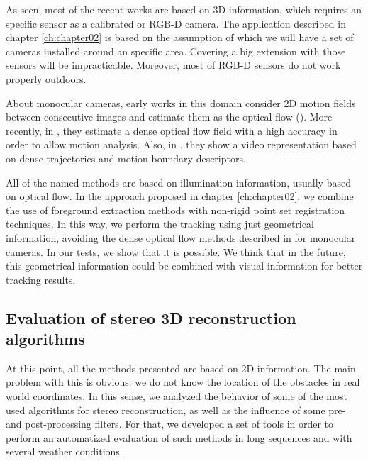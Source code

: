 As seen, most of the recent works are based on 3D information, which requires an specific sensor as a calibrated or RGB-D camera. The application described in chapter \ref{ch:chapter02} is based on the assumption of which we will have a set of cameras installed around an specific area. Covering a big extension with those sensors will be impracticable. Moreover, most of RGB-D sensors do not work properly outdoors.

About monocular cameras, early works in this domain consider 2D motion fields between consecutive images and estimate them as the optical flow (\cite{birchfield1997derivation}). More recently, in \cite{brox2011large}, they estimate a dense optical flow field with a high accuracy in order to allow motion analysis. Also, in \cite{wang2013dense}, they show a video representation based on dense trajectories and motion boundary descriptors.

All of the named methods are based on illumination information, usually based on optical flow. In the approach proposed in chapter \ref{ch:chapter02}, we combine the use of foreground extraction methods with non-rigid point set registration techniques. In this way, we perform the tracking using just geometrical information, avoiding the dense optical flow methods described in \cite{brox2011large, wang2013dense} for monocular cameras. In our tests, we show that it is possible. We think that in the future, this geometrical information could be combined with visual information for better tracking results.

\subsection{Evaluation of stereo 3D reconstruction algorithms}\label{ch:chapter00_02_03}

At this point, all the methods presented are based on 2D information. The main problem with this is obvious: we do not know the location of the obstacles in real world coordinates. In this sense, we analyzed the behavior of some of the most used algorithms for stereo reconstruction, as well as the influence of some pre- and post-processing filters. For that, we developed a set of tools in order to perform an automatized evaluation of such methods in long sequences and with several weather conditions. 


